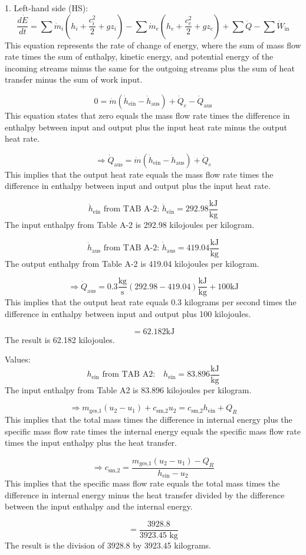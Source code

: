 1. Left-hand side (HS):
\[
\frac{d\dot{E}}{dt} = \sum \dot{m}_i \left( h_i + \frac{c_i^2}{2} + g z_i \right) - \sum \dot{m}_e \left( h_e + \frac{c_e^2}{2} + g z_e \right) + \sum \dot{Q} - \sum \dot{W}_{\text{in}}
\]
This equation represents the rate of change of energy, where the sum of mass flow rate times the sum of enthalpy, kinetic energy, and potential energy of the incoming streams minus the same for the outgoing streams plus the sum of heat transfer minus the sum of work input.

\[
0 = \dot{m} (\dot{h}_{\text{ein}} - \dot{h}_{\text{aus}}) + \dot{Q}_e - \dot{Q}_{\text{aus}}
\]
This equation states that zero equals the mass flow rate times the difference in enthalpy between input and output plus the input heat rate minus the output heat rate.

\[
\Rightarrow \dot{Q}_{\text{aus}} = \dot{m} (\dot{h}_{\text{ein}} - \dot{h}_{\text{aus}}) + \dot{Q}_e
\]
This implies that the output heat rate equals the mass flow rate times the difference in enthalpy between input and output plus the input heat rate.

\[
\dot{h}_{\text{ein}} \text{ from TAB A-2: } \dot{h}_{\text{ein}} = 292.98 \frac{\text{kJ}}{\text{kg}}
\]
The input enthalpy from Table A-2 is 292.98 kilojoules per kilogram.

\[
\dot{h}_{\text{aus}} \text{ from TAB A-2: } \dot{h}_{\text{aus}} = 419.04 \frac{\text{kJ}}{\text{kg}}
\]
The output enthalpy from Table A-2 is 419.04 kilojoules per kilogram.

\[
\Rightarrow \dot{Q}_{\text{aus}} = 0.3 \frac{\text{kg}}{\text{s}} \left( 292.98 - 419.04 \right) \frac{\text{kJ}}{\text{kg}} + 100 \text{kJ}
\]
This implies that the output heat rate equals 0.3 kilograms per second times the difference in enthalpy between input and output plus 100 kilojoules.

\[
= 62.182 \text{kJ}
\]
The result is 62.182 kilojoules.

Values:
\[
h_{\text{ein}} \text{ from TAB A2:} \quad h_{\text{ein}} = 83.896 \frac{\text{kJ}}{\text{kg}}
\]
The input enthalpy from Table A2 is 83.896 kilojoules per kilogram.

\[
\Rightarrow m_{\text{ges,1}} (u_2 - u_1) + c_{\text{sm,2}} u_2 = c_{\text{sm,2}} h_{\text{ein}} + Q_R
\]
This implies that the total mass times the difference in internal energy plus the specific mass flow rate times the internal energy equals the specific mass flow rate times the input enthalpy plus the heat transfer.

\[
\Rightarrow c_{\text{sm,2}} = \frac{m_{\text{ges,1}} (u_2 - u_1) - Q_R}{h_{\text{ein}} - u_2}
\]
This implies that the specific mass flow rate equals the total mass times the difference in internal energy minus the heat transfer divided by the difference between the input enthalpy and the internal energy.

\[
= \frac{3928.8}{3923.45 \text{ kg}}
\]
The result is the division of 3928.8 by 3923.45 kilograms.